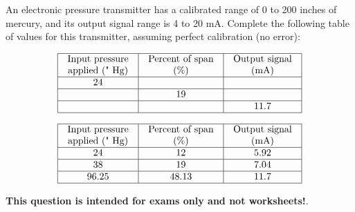 

An electronic pressure transmitter has a calibrated range of 0 to 200 inches of mercury, and its output signal range is 4 to 20 mA.  Complete the following table of values for this transmitter, assuming perfect calibration (no error):


$$\vbox{\offinterlineskip
\halign{\strut
\vrule \quad\hfil # \ \hfil & 
\vrule \quad\hfil # \ \hfil & 
\vrule \quad\hfil # \ \hfil \vrule \cr
\noalign{\hrule}
%
Input pressure & Percent of span & Output signal \cr
%
applied (" Hg) & (\%) & (mA) \cr
%
\noalign{\hrule}
%
24 &  &  \cr
%
\noalign{\hrule}
%
 & 19 &  \cr
%
\noalign{\hrule}
%
 &  & 11.7 \cr
%
\noalign{\hrule}
} %
}$$ %









$$\vbox{\offinterlineskip
\halign{\strut
\vrule \quad\hfil # \ \hfil & 
\vrule \quad\hfil # \ \hfil & 
\vrule \quad\hfil # \ \hfil \vrule \cr
\noalign{\hrule}
%
Input pressure & Percent of span & Output signal \cr
%
applied (" Hg) & (\%) & (mA) \cr
%
\noalign{\hrule}
%
24 & 12 & 5.92 \cr
%
\noalign{\hrule}
%
38 & 19 & 7.04 \cr
%
\noalign{\hrule}
%
96.25 & 48.13 & 11.7 \cr
%
\noalign{\hrule}
} %
}$$ %







{\bf This question is intended for exams only and not worksheets!}.



